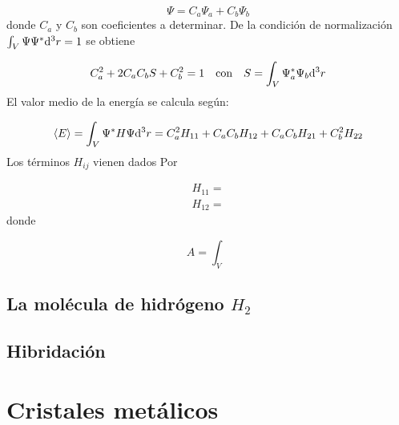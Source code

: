 \begin{equation}
    \Psi = C_a \Psi_a + C_b \Psi_b
\end{equation}
donde $C_a$ y $C_b$ son coeficientes a determinar. De la condición de normalización $\int_V \Psi \Psi^* \mathrm{d}^3 r = 1$ se obtiene 

\begin{equation}
    C_a^2 + 2 C_a C_b S + C_b^2 = 1 \quad \text{con} \quad S = \int_V \Psi_a^* \Psi_b \mathrm{d}^3 r
\end{equation}
El valor medio de la energía se calcula según:

\begin{equation}
    \langle E \rangle = \int_V \Psi^* H \Psi \mathrm{d}^3 r = C_a^2 H_{11} + C_a C_b H_{12} + C_a C_b H_{21} + C_b^2 H_{22}
\end{equation}
Los términos $H_{ij}$ vienen dados Por

\begin{align*}
    H_{11} =  \\
    H_{12} =
\end{align*}
donde 

\begin{equation*}
    A = \int_V
\end{equation*}


\subsection{La molécula de hidrógeno $H_2$}
\subsection{Hibridación}

\section{Cristales metálicos}


